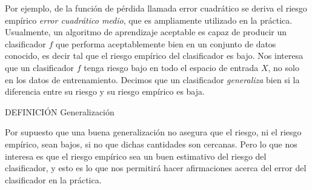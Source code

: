 \documentclass{report}
\begin{document}
Por ejemplo, de la función de pérdida llamada error cuadrático se deriva el riesgo empírico \textit{error cuadrático medio}, que es ampliamente
utilizado en la práctica. Usualmente, un algoritmo de aprendizaje aceptable es capaz de producir un clasificador $f$ que performa aceptablemente bien en un conjunto de datos
conocido, es decir tal que el riesgo empírico del clasificador es bajo. Nos interesa que un clasificador $f$ tenga riesgo bajo en todo el espacio
de entrada $X$, no solo en los datos de entrenamiento. Decimos que un clasificador \textit{generaliza} bien si la diferencia entre su riesgo
y su riesgo empírico es baja.\newline

DEFINICIÓN Generalización\newline

Por supuesto que una buena generalización no asegura que el riesgo, ni el riesgo empírico, sean bajos, si no que dichas cantidades son cercanas.
Pero lo que nos interesa es que el riesgo empírico sea un buen estimativo del riesgo del clasificador, y esto es lo que nos permitirá
hacer afirmaciones acerca del error del clasificador en la práctica.
\end{document}
